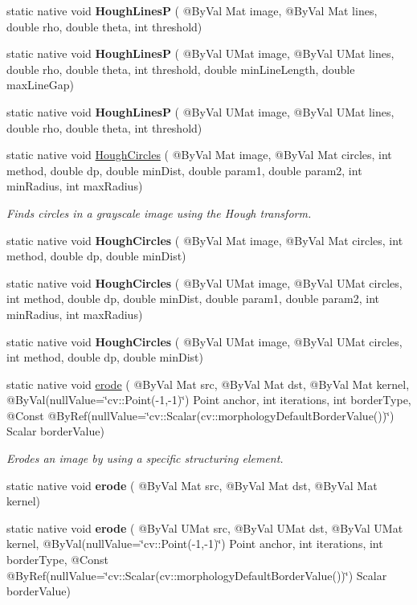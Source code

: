 \begin{DoxyCompactItemize}
static native void {\bfseries Hough\+LinesP} ( @By\+Val Mat image, @By\+Val Mat lines, double rho, double theta, int threshold)
\item 
static native void {\bfseries Hough\+LinesP} ( @By\+Val U\+Mat image, @By\+Val U\+Mat lines, double rho, double theta, int threshold, double min\+Line\+Length, double max\+Line\+Gap)
\item 
static native void {\bfseries Hough\+LinesP} ( @By\+Val U\+Mat image, @By\+Val U\+Mat lines, double rho, double theta, int threshold)
\item 
static native void \hyperlink{group__imgproc__feature_ga600228eea1d6673137492fb0d0c1b8d5}{Hough\+Circles} ( @By\+Val Mat image, @By\+Val Mat circles, int method, double dp, double min\+Dist, double param1, double param2, int min\+Radius, int max\+Radius)
\begin{DoxyCompactList}\small\item\em Finds circles in a grayscale image using the Hough transform. \end{DoxyCompactList}\item 
static native void {\bfseries Hough\+Circles} ( @By\+Val Mat image, @By\+Val Mat circles, int method, double dp, double min\+Dist)
\item 
static native void {\bfseries Hough\+Circles} ( @By\+Val U\+Mat image, @By\+Val U\+Mat circles, int method, double dp, double min\+Dist, double param1, double param2, int min\+Radius, int max\+Radius)
\item 
static native void {\bfseries Hough\+Circles} ( @By\+Val U\+Mat image, @By\+Val U\+Mat circles, int method, double dp, double min\+Dist)
\item 
static native void \hyperlink{group__imgproc__filter_ga8c0cbcc8dd271aada560698924d19cb2}{erode} ( @By\+Val Mat src, @By\+Val Mat dst, @By\+Val Mat kernel, @By\+Val(null\+Value=\char`\"{}cv\+::\+Point(-\/1,-\/1)\char`\"{}) Point anchor, int iterations, int border\+Type, @Const @By\+Ref(null\+Value=\char`\"{}cv\+::\+Scalar(cv\+::morphology\+Default\+Border\+Value())\char`\"{}) Scalar border\+Value)
\begin{DoxyCompactList}\small\item\em Erodes an image by using a specific structuring element. \end{DoxyCompactList}\item 
static native void {\bfseries erode} ( @By\+Val Mat src, @By\+Val Mat dst, @By\+Val Mat kernel)
\item 
static native void {\bfseries erode} ( @By\+Val U\+Mat src, @By\+Val U\+Mat dst, @By\+Val U\+Mat kernel, @By\+Val(null\+Value=\char`\"{}cv\+::\+Point(-\/1,-\/1)\char`\"{}) Point anchor, int iterations, int border\+Type, @Const @By\+Ref(null\+Value=\char`\"{}cv\+::\+Scalar(cv\+::morphology\+Default\+Border\+Value())\char`\"{}) Scalar border\+Value)

\end{DoxyCompactItemize}
